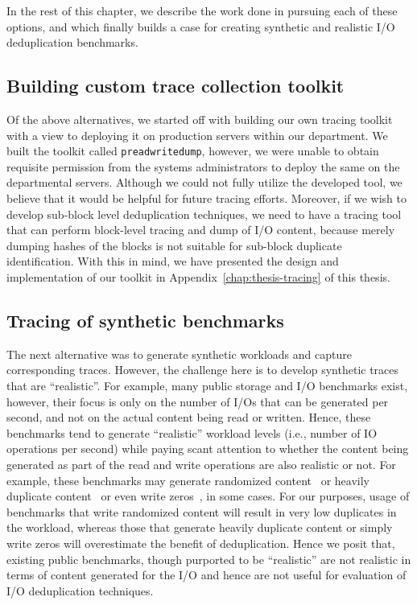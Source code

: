 In the rest of this chapter, we describe the work done 
in pursuing each of these options, and which finally 
builds a case for creating synthetic and realistic
I/O deduplication benchmarks.

\subsection{Building custom trace collection toolkit}
Of the above alternatives, we started off with building our own tracing 
toolkit with a view to deploying it on production servers within our
department. We built the toolkit called \texttt{preadwritedump}, however, 
we were unable to obtain requisite permission from the systems 
administrators to deploy the same on the departmental servers. Although
we could not fully utilize the developed tool, we believe that it would
be helpful for future tracing efforts. Moreover, if we wish to develop
sub-block level deduplication techniques, we need to have a tracing tool
that can perform block-level tracing and dump of I/O content, because 
merely dumping hashes of the blocks is not suitable for sub-block duplicate
identification. With this in mind, we have presented the design and 
implementation of our toolkit in Appendix~\ref{chap:thesis-tracing}
of this thesis.

\subsection{Tracing of synthetic benchmarks}
The next alternative was to generate 
synthetic workloads and capture corresponding 
traces. However,
the challenge here is to develop synthetic traces that are ``realistic''. 
For example, many public storage and I/O benchmarks exist, however, their 
focus is only on the number of I/Os that can be
generated per second, and not on the actual content being read or written. 
Hence, these benchmarks tend to generate ``realistic'' workload levels (i.e., number of IO 
operations per second) while paying scant attention to
whether the content being generated as part of the read and write 
operations are also realistic or not.
For example, these benchmarks may generate randomized content~\cite{postmark}
or heavily duplicate content~\cite{rubis}
or even write zeros~\cite{zeros}, in some cases. 
For our purposes, usage of benchmarks that write randomized content
will result in very low duplicates in the workload, whereas those that
generate heavily duplicate content or simply write zeros will overestimate 
the benefit of deduplication.
Hence we posit that, existing public benchmarks, though purported 
to be ``realistic'' are not realistic in terms of content generated
for the I/O and hence are not useful for evaluation of I/O deduplication techniques.

